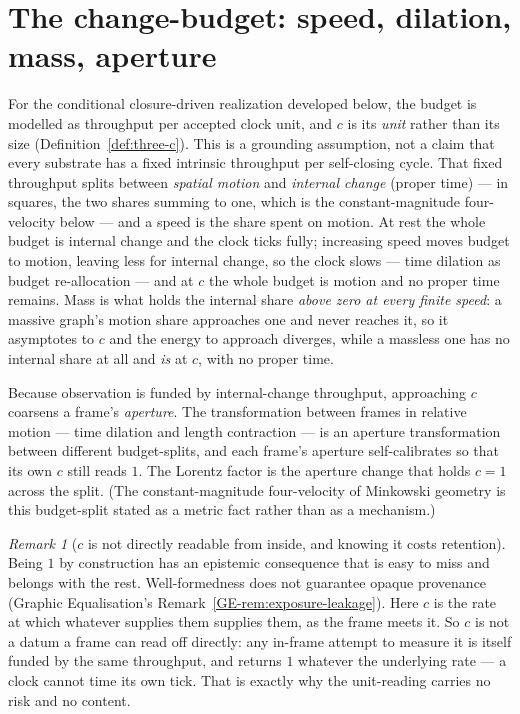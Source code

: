\documentclass[11pt,a4paper]{article}
\theoremstyle{remark}\newtheorem{remark}[definition]{Remark}
\begin{document}
\section{The change-budget: speed, dilation, mass, aperture}\label{sec:budget}
For the conditional closure-driven realization developed below, the budget is modelled as
throughput per accepted clock unit, and $c$ is its \emph{unit} rather than its size
(Definition~\ref{def:three-c}). This is a grounding assumption, not a claim that every substrate
has a fixed intrinsic throughput per self-closing cycle. That fixed throughput splits between
\emph{spatial motion} and \emph{internal change} (proper time) --- in squares, the
two shares summing to one, which is the constant-magnitude four-velocity below ---
and a speed is the share spent on motion. At rest the whole budget is internal
change and the clock ticks fully; increasing speed moves budget to motion, leaving
less for internal change, so the clock slows --- time dilation as budget
re-allocation --- and at $c$ the whole budget is motion and no proper time remains.
Mass is what holds the internal share \emph{above zero at every finite speed}: a
massive graph's motion share approaches one and never reaches it, so it asymptotes
to $c$ and the energy to approach diverges, while a massless one has no internal
share at all and \emph{is} at $c$, with no proper time.

Because observation is funded by internal-change throughput, approaching $c$
coarsens a frame's \emph{aperture}. The transformation between frames in relative
motion --- time dilation and length contraction --- is an aperture transformation
between different budget-splits, and each frame's aperture self-calibrates so that
its own $c$ still reads $1$. The Lorentz factor is the aperture change that holds
$c=1$ across the split. (The constant-magnitude four-velocity of Minkowski
geometry \citep{minkowski1908} is this budget-split stated as a metric fact
rather than as a mechanism.)

\begin{remark}[$c$ is not directly readable from inside, and knowing it costs
retention]\label{rem:c-indirect}
Being $1$ by construction has an epistemic consequence that is easy to miss and belongs with the
rest. Well-formedness does not guarantee opaque provenance (Graphic Equalisation's Remark~\ref{GE-rem:exposure-leakage}). Here $c$ is the rate at
which whatever supplies them supplies them, as the frame meets it. So $c$ is not a datum a frame can read off directly: any in-frame attempt to measure it is itself
funded by the same throughput, and returns $1$ whatever the underlying rate --- a clock cannot time
its own tick. That is exactly why the unit-reading carries no risk and no content.
\end{remark}
\end{document}
